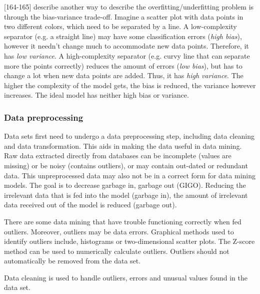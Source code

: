 \textcite{DataMiningAndPredictiveAnalytics}[164-165] describe another way to describe the overfitting/underfitting problem is through the bias-variance trade-off. Imagine a scatter plot with data points in two different colors, which need to be separated by a line. A low-complexity separator (e.g. a straight line) may have some classification errors (\textit{high bias}), however it needn't change much to accommodate new data points. Therefore, it has \textit{low variance}. A high-complexity separator (e.g. curvy line that can separate more the points correctly) reduces the amount of errors (\textit{low bias}), but has to change a lot when new data points are added. Thus, it has \textit{high variance}. The higher the complexity of the model gets, the bias is reduced, the variance however increases. The ideal model has neither high bias or variance.

\subsubsection{Data preprocessing}
Data sets first need to undergo a data preprocessing step, including data cleaning and data transformation. This aids in making the data useful in data mining. Raw data extracted directly from databases can be incomplete (values are missing) or be noisy (contains outliers), or may contain out-dated or redundant data. This unpreprocessed data may also not be in a correct form for data mining models. The goal is to decrease garbage in, garbage out (GIGO). Reducing the irrelevant data that is fed into the model (garbage in), the amount of irrelevant data received out of the model is reduced (garbage out).

There are some data mining that have trouble functioning correctly when fed outliers. Moreover, outliers may be data errors. Graphical methods used to identify outliers include, histograms or two-dimensional scatter plots.
The Z-score method can be used to numerically calculate outliers. Outliers should not automatically be removed from the data set.

Data cleaning is used to handle outliers, errors and unusual values found in the data set.

